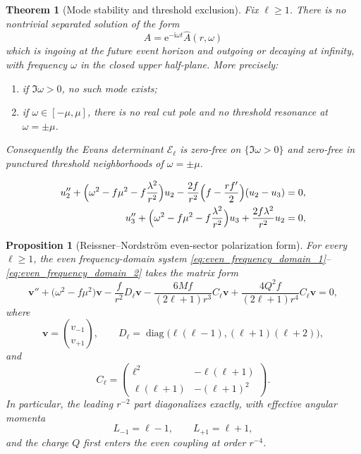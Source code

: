 \documentclass[10pt,a4paper]{amsart}
\newtheorem{theorem}{Theorem}
\newtheorem{proposition}{Proposition}
\newcommand{\cE}{\mathcal E}
\newcommand{\diag}{\operatorname{diag}}
\newcommand{\ee}{\mathrm e}
\newcommand{\ii}{\mathrm i}
\newcommand{\la}{\lambda}
\newcommand{\om}{\omega}
\begin{document}
\begin{theorem}[Mode stability and threshold exclusion]\label{thm:mode_stability}
Fix $\ell\ge1$.  There is no nontrivial separated solution of the form
\[
   A=\ee^{-\ii\om t}\widehat A(r,\omega)
\]
which is ingoing at the future event horizon and outgoing or decaying at infinity, with frequency $\om$ in the closed upper half-plane.  More precisely:
\begin{enumerate}[label=\textnormal{(\roman*)}]
   \item if $\Im\om>0$, no such mode exists;
   \item if $\om\in[-\mu,\mu]$, there is no real cut pole and no threshold resonance at $\om=\pm\mu$.
\end{enumerate}
Consequently the Evans determinant $\cE_\ell$ is zero-free on $\{\Im\om>0\}$ and zero-free in punctured threshold neighborhoods of $\om=\pm\mu$.
\end{theorem}

\begin{align}
   u_2''+\Bigl(\om^2-f\mu^2-f\frac{\la^2}{r^2}\Bigr)u_2
   -\frac{2f}{r^2}\Bigl(f-\frac{r f'}{2}\Bigr)(u_2-u_3)&=0,
   \label{eq:even_frequency_domain_1}
   \\
   u_3''+\Bigl(\om^2-f\mu^2-f\frac{\la^2}{r^2}\Bigr)u_3
   +\frac{2f\la^2}{r^2}u_2&=0,
   \label{eq:even_frequency_domain_2}
\end{align}

\begin{proposition}[Reissner--Nordstr\"om even-sector polarization form]\label{prop:even_polarization_form}
For every $\ell\ge1$, the even frequency-domain system
\eqref{eq:even_frequency_domain_1}--\eqref{eq:even_frequency_domain_2} takes the matrix form
\begin{equation}\label{eq:even_matrix_form}
   \bm v''+\bigl(\om^2-f\mu^2\bigr)\bm v
   -\frac{f}{r^2}D_\ell\bm v
   -\frac{6Mf}{(2\ell+1)r^3}C_\ell\bm v
   +\frac{4Q^2f}{(2\ell+1)r^4}C_\ell\bm v
   =0,
\end{equation}
where
\begin{equation}\label{eq:D_matrix}
   \bm v=\binom{v_{-1}}{v_{+1}},
   \qquad
   D_\ell=\diag\bigl(\ell(\ell-1),(\ell+1)(\ell+2)\bigr),
\end{equation}
and
\begin{equation}\label{eq:C_matrix}
   C_\ell=
   \begin{pmatrix}
      \ell^2&-\ell(\ell+1)\\
      \ell(\ell+1)&-(\ell+1)^2
   \end{pmatrix}.
\end{equation}
In particular, the leading $r^{-2}$ part diagonalizes exactly, with effective angular momenta
\begin{equation}\label{eq:effective_Ls}
   L_{-1}=\ell-1,
   \qquad
   L_{+1}=\ell+1,
\end{equation}
and the charge $Q$ first enters the even coupling at order $r^{-4}$.
\end{proposition}
\end{document}
